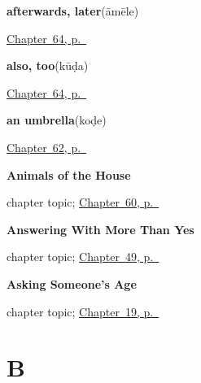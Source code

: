 \noindent\begin{minipage}[t]{\linewidth}
\raggedright
\textbf{afterwards, later}\enspace\emph{}\enspace(āmēle)\par
\footnotesize \hyperref[ch:ka-joining]{Chapter~64, p.~\pageref*{ch:ka-joining}}
\end{minipage}\par\smallskip

\noindent\begin{minipage}[t]{\linewidth}
\raggedright
\textbf{also, too}\enspace\emph{}\enspace(kūḍa)\par
\footnotesize \hyperref[ch:ka-joining]{Chapter~64, p.~\pageref*{ch:ka-joining}}
\end{minipage}\par\smallskip

\noindent\begin{minipage}[t]{\linewidth}
\raggedright
\textbf{an umbrella}\enspace\emph{}\enspace(koḍe)\par
\footnotesize \hyperref[ch:ka-made]{Chapter~62, p.~\pageref*{ch:ka-made}}
\end{minipage}\par\smallskip

\noindent\begin{minipage}[t]{\linewidth}
\raggedright
\textbf{Animals of the House}\par
\footnotesize chapter topic; \hyperref[ch:ka-animals]{Chapter~60, p.~\pageref*{ch:ka-animals}}
\end{minipage}\par\smallskip

\noindent\begin{minipage}[t]{\linewidth}
\raggedright
\textbf{Answering With More Than Yes}\par
\footnotesize chapter topic; \hyperref[ch:ka-replies]{Chapter~49, p.~\pageref*{ch:ka-replies}}
\end{minipage}\par\smallskip

\noindent\begin{minipage}[t]{\linewidth}
\raggedright
\textbf{Asking Someone's Age}\par
\footnotesize chapter topic; \hyperref[ch:ka-asking-age]{Chapter~19, p.~\pageref*{ch:ka-asking-age}}
\end{minipage}\par\smallskip

\section*{B}

